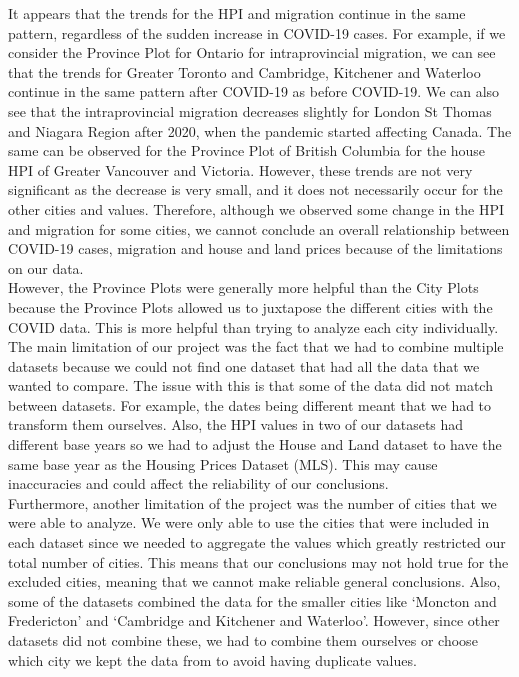\documentclass[fontsize=11pt]{article}
\begin{document}
It appears that the trends for the HPI and migration continue in the same pattern, regardless of the sudden increase in COVID-19 cases. For example, if we consider the Province Plot for Ontario for intraprovincial migration, we can see that the trends for Greater Toronto and Cambridge, Kitchener and Waterloo continue in the same pattern after COVID-19 as before COVID-19. We can also see that the intraprovincial migration decreases slightly for London St Thomas and Niagara Region after 2020, when the pandemic started affecting Canada. The same can be observed for the Province Plot of British Columbia for the house HPI of Greater Vancouver and Victoria. However, these trends are not very significant as the decrease is very small, and it does not necessarily occur for the other cities and values. Therefore, although we observed some change in the HPI and migration for some cities, we cannot conclude an overall relationship between COVID-19 cases, migration and house and land prices because of the limitations on our data.\\

However, the Province Plots were generally more helpful than the City Plots because the Province Plots allowed us to juxtapose the different cities with the COVID data. This is more helpful than trying to analyze each city individually. \\

The main limitation of our project was the fact that we had to combine multiple datasets because we could not find one dataset that had all the data that we wanted to compare. The issue with this is that some of the data did not match between datasets. For example, the dates being different meant that we had to transform them ourselves. Also, the HPI values in two of our datasets had different base years so we had to adjust the House and Land dataset to have the same base year as the Housing Prices Dataset (MLS). This may cause inaccuracies and could affect the reliability of our conclusions. \\

Furthermore, another limitation of the project was the number of cities that we were able to analyze. We were only able to use the cities that were included in each dataset since we needed to aggregate the values which greatly restricted our total number of cities. This means that our conclusions may not hold true for the excluded cities, meaning that we cannot make reliable general conclusions. Also, some of the datasets combined the data for the smaller cities like ‘Moncton and Fredericton’ and ‘Cambridge and Kitchener and Waterloo’. However, since other datasets did not combine these, we had to combine them ourselves or choose which city we kept the data from to avoid having duplicate values. \\
\end{document}
